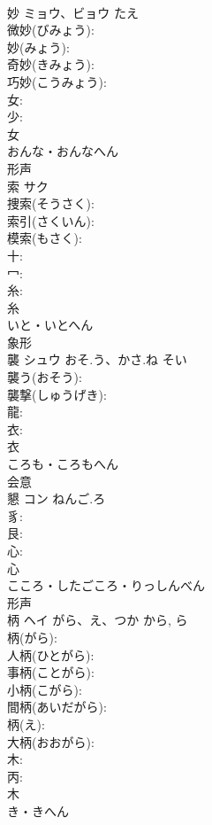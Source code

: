 \documentclass[8pt]{extreport}
\begin{document}
\begin{CJK}{UTF8}{min}
\\	妙	ミョウ、ビョウ	たえ		
\\	微妙(びみょう): 
\\	妙(みょう): 
\\	奇妙(きみょう): 
\\	巧妙(こうみょう): 
\\	女: 
\\	少: 
\\	女	
\\	おんな・おんなへん	
\\	形声 
\\	索	サク			
\\	捜索(そうさく): 
\\	索引(さくいん): 
\\	模索(もさく): 
\\	十: 
\\	冖: 
\\	糸: 
\\	糸	
\\	いと・いとへん	
\\	象形 
\\	襲	シュウ	おそ.う、かさ.ね	そい	
\\	襲う(おそう): 
\\	襲撃(しゅうげき): 
\\	龍: 
\\	衣: 
\\	衣	
\\	ころも・ころもへん	
\\	会意 
\\	懇	コン	ねんご.ろ		
\\	豸: 
\\	艮: 
\\	心: 
\\	心	
\\	こころ・したごころ・りっしんべん	
\\	形声 
\\	柄	ヘイ	がら、え、つか	から, ら	
\\	柄(がら): 
\\	人柄(ひとがら): 
\\	事柄(ことがら): 
\\	小柄(こがら): 
\\	間柄(あいだがら): 
\\	柄(え): 
\\	大柄(おおがら): 
\\	木: 
\\	丙: 
\\	木	
\\	き・きへん	

\end{CJK}
\end{document}
